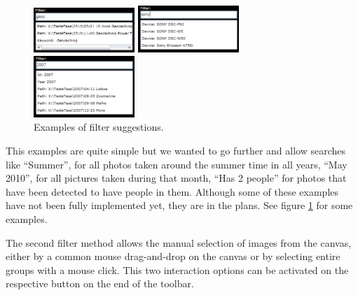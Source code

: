 \begin{figure}
	\vspace{-20pt}
	\begin{center}
		\includegraphics[width=0.34\textwidth]{Figures/filter_0000_geoc.png}

		\vspace{7pt}

		\includegraphics[width=0.34\textwidth]{Figures/filter_0001_sony.png}

		\vspace{7pt}

		\includegraphics[width=0.34\textwidth]{Figures/filter_0004_2007.png}
	\end{center}
	\vspace{-25pt}
	\caption{Examples of filter suggestions.}
	\vspace{-5pt}
	\label{fig:filter}
\end{figure}

This examples are quite simple but we wanted to go further and allow searches like ``Summer'', for all photos taken around the summer time in all years, ``May 2010'', for all pictures taken during that month, ``Has 2 people'' for photos that have been detected to have people in them. Although some of these examples have not been fully implemented yet, they are in the plans. See figure \ref{fig:filter} for some examples.

The second filter method allows the manual selection of images from the canvas, either by a common mouse drag-and-drop on the canvas or by selecting entire groups with a mouse click. This two interaction options can be activated on the respective button on the end of the toolbar. 


